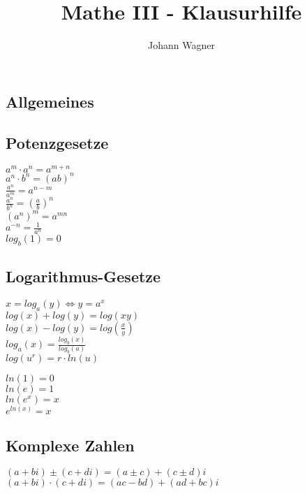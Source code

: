 \documentclass[a4paper, 11pt]{article}
\author{Johann Wagner}
\title{Mathe III - Klausurhilfe}
\begin{document}
    \begin{multicols}{3}
        
    
    \begin{small}
    \section{Allgemeines}
        \subsection{Potenzgesetze}
            \begin{multicols}{2}
            $a^m \cdot a^n = a^{m+n}$\\
            $a^n \cdot b^n = (ab)^n$\\
            $\frac{a^n}{a^m} = a^{n-m}$\\
            $\frac{a^n}{b^n} = \left(\frac{a}{b}\right)^n$\\
            $(a^n)^m = a^{mn}$\\
            $a^{-n} = \frac{1}{a^n}$\\
            $log_b(1) = 0$
            \end{multicols}
         \subsection{Logarithmus-Gesetze}
            \noindent
            $x = log_a(y) \Leftrightarrow y = a^x$\\
            $log(x) + log(y) = log(xy)$\\
            $log(x) - log(y) = log(\frac{x}{y})$\\
            $log_a(x) = \frac{log_b(x)}{log_b(a)}$  \\
            $log(u^r) = r \cdot ln(u)$
            \begin{multicols}{2}
            \noindent
            $ln(1) = 0$ \\
            $ln(e) = 1$ \\
            $ln(e^x) = x$ \\
            $e^{ln(x)} = x$
            \end{multicols}
        \subsection{Komplexe Zahlen}
        $(a + bi) \pm (c + di) = (a \pm c) + (c \pm d)i$\\
        $(a + bi) \cdot (c + di) = (ac - bd) + (ad + bc)i$\\
    

\end{small}
\end{multicols}
\end{document}
